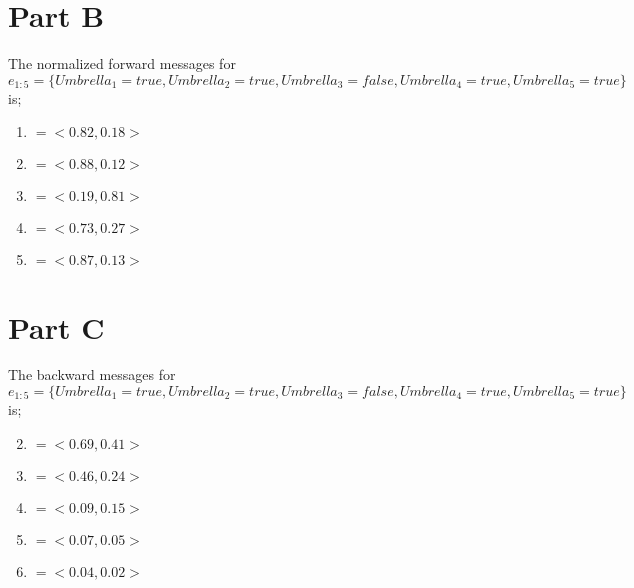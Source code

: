 \documentclass[12pt, letterpaper]{article}
\begin{document}
\section{Part B}
The normalized forward messages for $e_{1:5} = \{Umbrella_1 = true, Umbrella_2 =
true, Umbrella_3 = false, Umbrella_4 = true, Umbrella_5 = true\}$ is;
\begin{enumerate}[label=$f_{1:\arabic*}$]
\item $=<0.82, 0.18>$
\item $=<0.88, 0.12>$
\item $=<0.19, 0.81>$
\item $=<0.73, 0.27>$
\item $=<0.87, 0.13>$
\end{enumerate}

\section{Part C}
The backward messages for $e_{1:5} = \{Umbrella_1 = true, Umbrella_2 =
true, Umbrella_3 = false, Umbrella_4 = true, Umbrella_5 = true\}$ is;
\begin{enumerate}[label=$b_{\arabic*:t}$]
  \setcounter{enumi}{1}
\item $=<0.69, 0.41>$
\item $=<0.46, 0.24>$
\item $=<0.09, 0.15>$
\item $=<0.07, 0.05>$
\item $=<0.04, 0.02>$
\end{enumerate}
\end{document}
